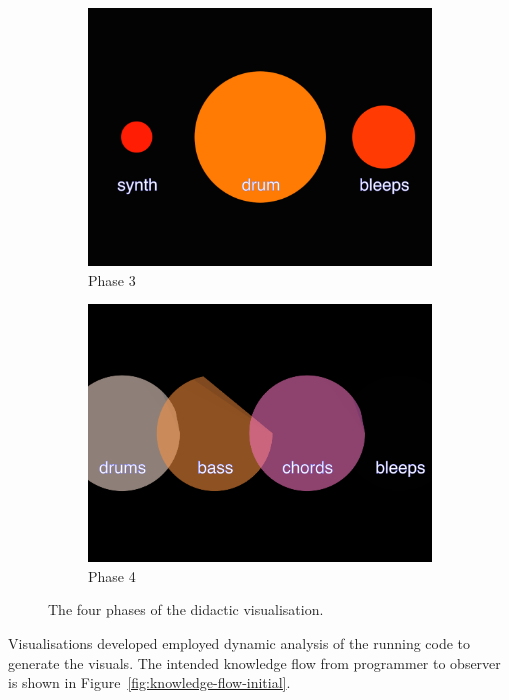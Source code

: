 \begin{figure}
\begin{subfigure}{.5\textwidth}
  \includegraphics[width=.95\linewidth]{../study-2/results/visualisations/didactic-three.png}
  \caption{Phase 3}
  \label{fig:didactic-three}
\end{subfigure}%
\begin{subfigure}{.5\textwidth}
  \centering
  \includegraphics[width=.95\linewidth]{../study-2/results/visualisations/didactic-four.png}
  \caption{Phase 4}
  \label{fig:didactic-four}
\end{subfigure}

\caption[Didactic visualisation phases]{The four phases of the didactic visualisation.}
\label{fig:didactic-visualisations}
\end{figure}


Visualisations developed employed dynamic analysis of the running code to generate the visuals. The intended knowledge flow from programmer to observer is shown in Figure~\ref{fig:knowledge-flow-initial}.

